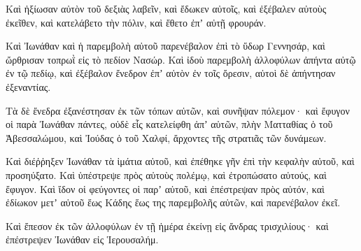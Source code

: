 {Καὶ ἠξίωσαν αὐτὸν τοῦ δεξιὰς λαβεῖν, καὶ ἔδωκεν αὐτοῖς, καὶ ἐξέβαλεν αὐτοὺς ἐκεῖθεν, καὶ κατελάβετο τὴν πόλιν, καὶ ἔθετο ἐπʼ αὐτῇ φρουράν.
\par }{\PP {}Καὶ Ἰωνάθαν καὶ ἡ παρεμβολὴ αὐτοῦ παρενέβαλον ἐπὶ τὸ ὕδωρ Γεννησάρ, καὶ ὤρθρισαν τοπρωῒ εἰς τὸ πεδίον Νασώρ.
Καὶ ἰδοὺ παρεμβολὴ ἀλλοφύλων ἀπήντα αὐτῷ ἐν τῷ πεδίῳ, καὶ ἐξέβαλον ἔνεδρον ἐπʼ αὐτὸν ἐν τοῖς ὄρεσιν, αὐτοὶ δὲ ἀπήντησαν ἐξεναντίας.
\par }{\PP {}Τὰ δὲ ἔνεδρα ἐξανέστησαν ἐκ τῶν τόπων αὐτῶν, καὶ συνῆψαν πόλεμον· καὶ ἔφυγον οἱ παρὰ Ἰωνάθαν πάντες,
οὐδὲ εἷς κατελείφθη ἀπʼ αὐτῶν, πλὴν Ματταθίας ὁ τοῦ Ἀβεσσαλώμου, καὶ Ἰούδας ὁ τοῦ Χαλφί, ἄρχοντες τῆς στρατιᾶς τῶν δυνάμεων.
\par }{\PP {}Καὶ διέῤῥηξεν Ἰωνάθαν τὰ ἱμάτια αὐτοῦ, καὶ ἐπέθηκε γῆν ἐπὶ τὴν κεφαλὴν αὐτοῦ, καὶ προσηύξατο.
Καὶ ὑπέστρεψε πρὸς αὐτοὺς πολέμῳ, καὶ ἐτροπώσατο αὐτούς, καὶ ἔφυγον.
Καὶ ἴδον οἱ φεύγοντες οἱ παρʼ αὐτοῦ, καὶ ἐπέστρεψαν πρὸς αὐτόν, καὶ ἐδίωκον μετʼ αὐτοῦ ἕως Κάδης ἕως της παρεμβολῆς αὐτῶν, καὶ παρενέβαλον ἐκεῖ.
\par }{\PP {}Καὶ ἔπεσον ἐκ τῶν ἀλλοφύλων ἐν τῇ ἡμέρα ἐκείνῃ εἰς ἄνδρας τρισχιλίους· καὶ ἐπέστρεψεν Ἰωνάθαν εἰς Ἱερουσαλήμ.

}
